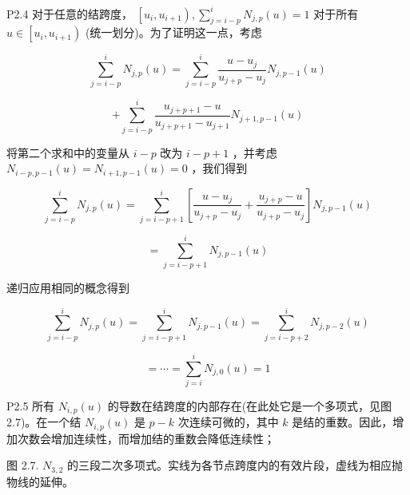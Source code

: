 \documentclass[../main.tex]{subfiles}
\begin{document}
P2.4 对于任意的结跨度， \(\left\lbrack  {{u}_{i},{u}_{i + 1}}\right) ,\mathop{\sum }\limits_{{j = i - p}}^{i}{N}_{j,p}\left( u\right)  = 1\) 对于所有 \(u \in  \left\lbrack  {{u}_{i},{u}_{i + 1}}\right)\) (统一划分)。为了证明这一点，考虑

\[
\mathop{\sum }\limits_{{j = i - p}}^{i}{N}_{j,p}\left( u\right)  = \mathop{\sum }\limits_{{j = i - p}}^{i}\frac{u - {u}_{j}}{{u}_{j + p} - {u}_{j}}{N}_{j,p - 1}\left( u\right)
\]

\[
+ \mathop{\sum }\limits_{{j = i - p}}^{i}\frac{{u}_{j + p + 1} - u}{{u}_{j + p + 1} - {u}_{j + 1}}{N}_{j + 1,p - 1}\left( u\right)
\]

将第二个求和中的变量从 \(i - p\) 改为 \(i - p + 1\) ，并考虑 \({N}_{i - p,p - 1}\left( u\right)  = {N}_{i + 1,p - 1}\left( u\right)  = 0\) ，我们得到

\[
\mathop{\sum }\limits_{{j = i - p}}^{i}{N}_{j,p}\left( u\right)  = \mathop{\sum }\limits_{{j = i - p + 1}}^{i}\left\lbrack  {\frac{u - {u}_{j}}{{u}_{j + p} - {u}_{j}} + \frac{{u}_{j + p} - u}{{u}_{j + p} - {u}_{j}}}\right\rbrack  {N}_{j,p - 1}\left( u\right)
\]

\[
= \mathop{\sum }\limits_{{j = i - p + 1}}^{i}{N}_{j,p - 1}\left( u\right)
\]

递归应用相同的概念得到

\[
\mathop{\sum }\limits_{{j = i - p}}^{i}{N}_{j,p}\left( u\right)  = \mathop{\sum }\limits_{{j = i - p + 1}}^{i}{N}_{j,p - 1}\left( u\right)  = \mathop{\sum }\limits_{{j = i - p + 2}}^{i}{N}_{j,p - 2}\left( u\right)
\]

\[
= \cdots  = \mathop{\sum }\limits_{{j = i}}^{i}{N}_{j,0}\left( u\right)  = 1
\]

P2.5 所有 \({N}_{i,p}\left( u\right)\) 的导数在结跨度的内部存在(在此处它是一个多项式，见图 2.7)。在一个结 \({N}_{i,p}\left( u\right)\) 是 \(p - k\) 次连续可微的，其中 \(k\) 是结的重数。因此，增加次数会增加连续性，而增加结的重数会降低连续性；

\begin{center}
\begin{minipage}{18cm}
\vspace*{.6\baselineskip}
\centering
{}
\par\smallskip

图 2.7. \({N}_{3,2}\) 的三段二次多项式。实线为各节点跨度内的有效片段，虚线为相应抛物线的延伸。
\end{minipage}
\end{center}
\end{document}
